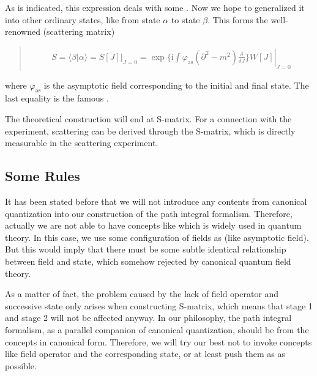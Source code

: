 \documentclass[letterpaper,10pt,english]{sphinxmanual}
\begin{document}
As is indicated, this expression deals with some . Now we hope to generalized it into other ordinary states, like from state \(\alpha\) to state \(\beta\). This forms the well-renowned  (scattering matrix)
\begin{quote}

\begin{equation*}
\begin{split}S = \langle \beta|\alpha\rangle = S[J]|_{J=0} = \left.\exp\{\mathrm{i}\int\varphi_{\text{as}}(\partial^2 - m^2)\frac{\delta}{\delta J}\}W[J]\right|_{J=0}\end{split}
\end{equation*}\end{quote}

where \(\varphi_{\text{as}}\) is the asymptotic field corresponding to the initial and final state. The last equality is the famous .

The theoretical construction will end at S-matrix. For a connection with the experiment, scattering  can be derived through the S-matrix, which is directly measurable in the scattering experiment.


\subsection{Some Rules}
\label{\detokenize{qft_sketch:some-rules}}
It has been stated before that we will not introduce any contents from canonical quantization into our construction of the path integral formalism. Therefore, actually we are not able to have concepts like  which is widely used in quantum theory. In this case, we  use some configuration of fields as  (like asymptotic field). But this would imply that there must be some subtle identical relationship between field and state, which somehow rejected by canonical quantum field theory.

As a matter of fact, the problem caused by the lack of field operator and successive state only arises when constructing S-matrix, which means that stage 1 and stage 2 will not be affected anyway. In our philosophy, the path integral formalism, as a parallel companion of canonical quantization, should be  from the concepts in canonical form. Therefore, we will try our best not to invoke concepts like field operator and the corresponding state, or at least push them as  as possible.
\end{document}
